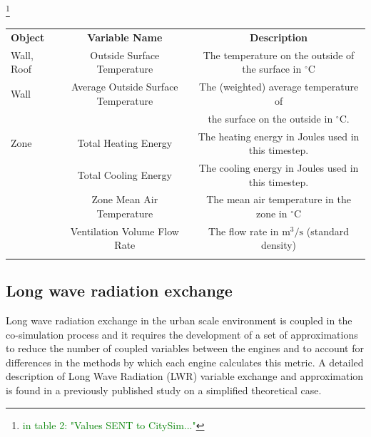 \documentclass{tBPS2e}
\theoremstyle{plain}
\theoremstyle{definition}
\theoremstyle{remark}
\newcommand{\noteDT}[1]{\footnote{\textcolor{green}{#1}}}
\begin{document}
\noteDT{in table 2: "Values SENT to CitySim..."}
\begin{table}[H]
{\begin{tabular}[l]{@{}lcc}\toprule
  \bf{Object} &  \bf{Variable Name} & \bf{Description} \\
\colrule
Wall, Roof & Outside Surface Temperature & The temperature on the outside of the surface in $^{\circ}\mathrm{C}$ \\    
    \hline
Wall & Average Outside Surface Temperature & The (weighted) average temperature of \\
& & the surface on the outside in $^{\circ}\mathrm{C}$. \\
    \hline
Zone & Total Heating Energy & The heating energy in Joules used in this timestep. \\
& Total Cooling Energy & The cooling energy in Joules used in this timestep. \\
& Zone Mean Air Temperature & The mean air temperature in the zone in $^{\circ}\mathrm{C}$ \\
& Ventilation Volume Flow Rate & The flow rate in $\mathrm{m}^3/\mathrm{s}$ (standard density) \\
\botrule
\end{tabular}}
\label{FMUexports}
\end{table}

\subsection{Long wave radiation exchange}

Long wave radiation exchange in the urban scale environment is coupled in the co-simulation process and it requires the development of a set of approximations to reduce the number of coupled variables between the engines and to account for differences in the methods by which each engine calculates this metric. A detailed description of Long Wave Radiation (LWR) variable exchange and approximation is found in a previously published study \citep{Miller:2015vk} on a simplified theoretical case. 
\end{document}
